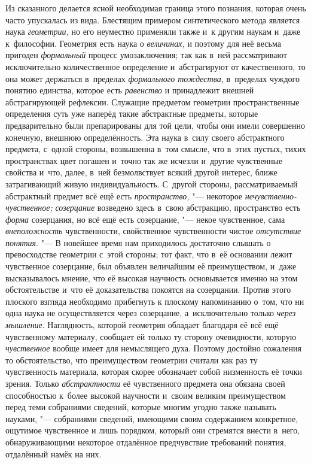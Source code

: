 Из сказанного делается ясной необходимая граница этого
познания, которая очень часто упускалась из вида. Блестящим примером
синтетического метода является наука
{\em геометрии,} но его
неуместно применяли также и~к другим наукам и~даже к~философии. Геометрия
есть наука о {\em величинах,}
и поэтому для неё весьма пригоден
{\em формальный} процесс
умозаключения; так как в~ней рассматривают исключительно
количественное определение и~абстрагируют от качественного, то она может
держаться в~пределах {\em формального
тождества,} в~пределах чуждого понятию единства, которое
есть {\em равенство} и
принадлежит внешней абстрагирующей рефлексии. Служащие предметом геометрии
пространственные определения суть уже наперёд такие абстрактные предметы,
которые предварительно были препарированы для той цели, чтобы они имели
совершенно конечную, внешнюю определённость. Эта наука в~силу своего
абстрактного предмета, с~одной стороны, возвышенна в~том смысле, что в~этих
пустых, тихих пространствах цвет погашен и~точно так же исчезли и~другие
чувственные свойства и~что, далее, в~ней безмолвствует всякий другой
интерес, ближе затрагивающий живую индивидуальность. С~другой стороны,
рассматриваемый абстрактный предмет всё ещё есть
{\em пространство,} "---
некоторое
{\em нечувственно-чувственное;}
{\em созерцание} возведено
здесь в~свою абстракцию, пространство есть
{\em форма} созерцания,
но всё ещё есть созерцание, "--- некое чувственное, сама
{\em внеположность}
чувственности, свойственное чувственности чистое
{\em отсутствие понятия}. "---
В новейшее время нам приходилось достаточно слышать о
превосходстве геометрии с~этой стороны; тот факт, что в~её основании лежит
чувственное созерцание, был объявлен величайшим её преимуществом, и~даже
высказывалось мнение, что её высокая научность основывается именно на этом
обстоятельстве и~что её доказательства покоятся на
созерцании.
Против этого плоского взгляда необходимо прибегнуть к
плоскому напоминанию о~том, что ни одна наука не осуществляется через
созерцание, а~исключительно только
{\em через мышление}.
Наглядность, которой геометрия обладает благодаря её всё ещё
чувственному материалу, сообщает ей только ту сторону очевидности, которую
{\em чувственное} вообще
имеет для немыслящего духа. Поэтому достойно сожаления то обстоятельство,
что преимуществом геометрии считали как раз ту чувственность материала,
которая скорее обозначает собой низменность её точки зрения. Только
{\em абстрактности} её
чувственного предмета она обязана своей способностью к~более высокой
научности и~своим великим преимуществом перед теми собраниями сведений,
которые многим угодно также называть науками, "--- собраниями
сведений, имеющими своим содержанием конкретное, ощутимое чувственное и
лишь порядком, который они стремятся внести в~него, обнаруживающими
некоторое отдалённое предчувствие требований понятия, отдалённый намёк на
них.

